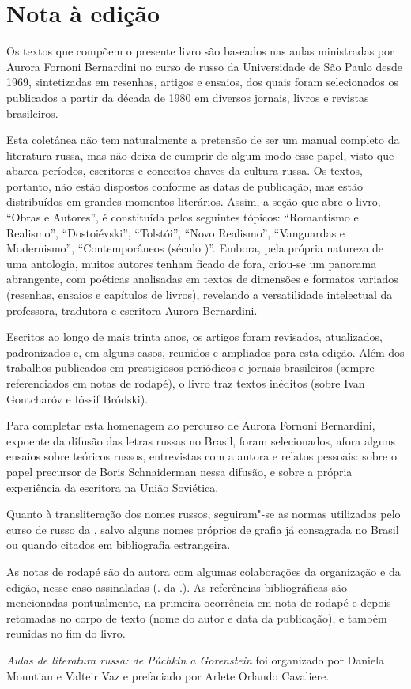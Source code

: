 \chapter{Nota à edição}

Os textos que compõem o presente livro são baseados nas aulas
ministradas por Aurora Fornoni Bernardini no curso de russo da
Universidade de São Paulo desde 1969, sintetizadas em resenhas, artigos
e ensaios, dos quais foram selecionados os publicados a partir da década
de 1980 em diversos jornais, livros e revistas brasileiros.

Esta coletânea não tem naturalmente a pretensão de ser um manual
completo da literatura russa, mas não deixa de cumprir de algum modo
esse papel, visto que abarca períodos, escritores e conceitos chaves da
cultura russa. Os textos, portanto, não estão dispostos conforme as
datas de publicação, mas estão distribuídos em grandes momentos
literários. Assim, a seção que abre o livro, ``Obras e Autores'', é
constituída pelos seguintes tópicos: ``Romantismo e Realismo'',
``Dostoiévski'', ``Tolstói'', ``Novo Realismo'', ``Vanguardas e
Modernismo'', ``Contemporâneos (século \scalebox{0.8}{XX})''. Embora, pela própria
natureza de uma antologia, muitos autores tenham ficado de fora,
criou-se um panorama abrangente, com poéticas analisadas em textos de
dimensões e formatos variados (resenhas, ensaios e capítulos de livros),
revelando a versatilidade intelectual da professora, tradutora e
escritora Aurora Bernardini.

Escritos ao longo de mais trinta anos, os artigos foram revisados,
atualizados, padronizados e, em alguns casos, reunidos e ampliados para
esta edição. Além dos trabalhos publicados em prestigiosos periódicos e
jornais brasileiros (sempre referenciados em notas de rodapé), o livro
traz textos inéditos (sobre Ivan Gontcharóv e Ióssif Bródski).

Para completar esta homenagem ao percurso de Aurora Fornoni Bernardini,
expoente da difusão das letras russas no Brasil, foram selecionados,
afora alguns ensaios sobre teóricos russos, entrevistas com a autora e
relatos pessoais: sobre o papel precursor de Boris Schnaiderman nessa
difusão, e sobre a própria experiência da escritora na União Soviética.

Quanto à transliteração dos nomes russos, seguiram"-se as normas
utilizadas pelo curso de russo da \scalebox{0.8}{USP}, salvo alguns nomes próprios de
grafia já consagrada no Brasil ou quando citados em bibliografia
estrangeira.

As notas de rodapé são da autora com algumas colaborações da organização
e da edição, nesse caso assinaladas (\scalebox{0.8}{N}. da \scalebox{0.8}{E}.). As referências
bibliográficas são mencionadas pontualmente, na primeira ocorrência em
nota de rodapé e depois retomadas no corpo de texto (nome do autor e
data da publicação), e também reunidas no fim do livro.

\emph{Aulas de literatura russa: de Púchkin a Gorenstein} foi
organizado por Daniela Mountian e Valteir Vaz e prefaciado por Arlete
Orlando Cavaliere.
